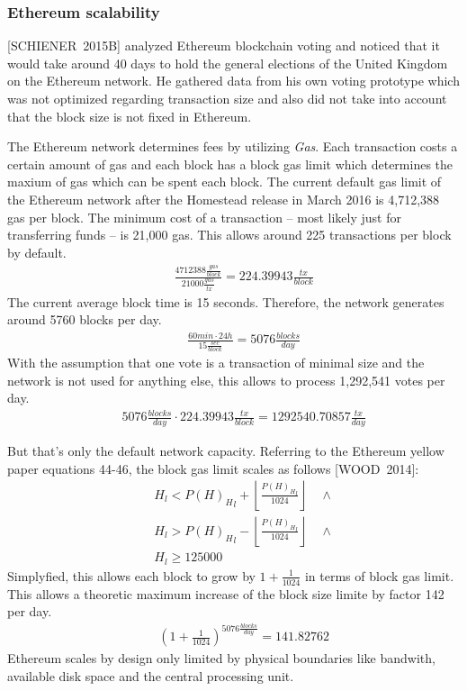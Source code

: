 \subsubsection{Ethereum scalability}
[SCHIENER~2015B] analyzed Ethereum blockchain voting and noticed that it would take around 40 days to hold the general elections of the United Kingdom on the Ethereum network. He gathered data from his own voting prototype which was not optimized regarding transaction size and also did not take into account that the block size is not fixed in Ethereum.\par
The Ethereum network determines fees by utilizing \textit{Gas}. Each transaction costs a certain amount of gas and each block has a block gas limit which determines the maxium of gas which can be spent each block. The current default gas limit of the Ethereum network after the Homestead release in March 2016 is 4,712,388 gas per block. The minimum cost of a transaction -- most likely just for transferring funds -- is 21,000 gas. This allows around 225 transactions per block by default.
\begin{eqnarray}
& & \frac {4712388 \frac{gas}{block}}{21000\frac{gas}{tx}} = 224.39943 \frac{tx}{block}
\end{eqnarray}
The current average block time is 15 seconds. Therefore, the network generates around 5760 blocks per day.
\begin{eqnarray}
& & \frac{60 min \cdot 24 h}{15 \frac{sec}{block}} = 5076 \frac {blocks}{day}
\end{eqnarray}
With the assumption that one vote is a transaction of minimal size and the network is not used for anything else, this allows to process 1,292,541 votes per day.
\begin{eqnarray}
& & 5076 \frac {blocks}{day} \cdot 224.39943 \frac {tx} {block} = 1292540.70857 \frac{tx}{day}
\end{eqnarray}\par
But that's only the default network capacity. Referring to the Ethereum yellow paper equations 44-46, the block gas limit scales as follows [WOOD~2014]:
\begin{eqnarray}
& & H_l < {P(H)_H}_l + \left\lfloor\frac{{P(H)_H}_l}{1024}\right\rfloor \quad \wedge \\ %
& & H_l > {P(H)_H}_l - \left\lfloor\frac{{P(H)_H}_l}{1024}\right\rfloor \quad \wedge \\ %
& & H_l \geqslant 125000 %
\end{eqnarray}
Simplyfied, this allows each block to grow by $1 + \frac{1}{1024}$ in terms of block gas limit. This allows a theoretic maximum increase of the block size limite by factor 142 per day.
\begin{eqnarray}
& & \left( 1 + \frac{1}{1024} \right) ^ {5076 \frac {blocks}{day}} = 141.82762
\end{eqnarray}
Ethereum scales by design only limited by physical boundaries like bandwith, available disk space and the central processing unit.

